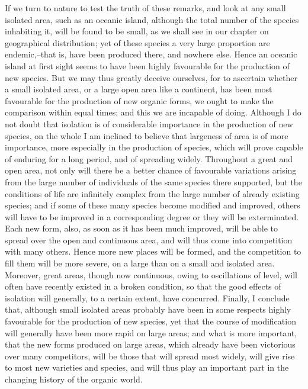 If we turn to nature to test the truth of these remarks, and look at any small isolated area, such as an oceanic island, although the total number of the species inhabiting it, will be found to be small, as we shall see in our chapter on geographical distribution; yet of these species a very large proportion are endemic,--that is, have been produced there, and nowhere else. Hence an oceanic island at first sight seems to have been highly favourable for the production of new species. But we may thus greatly deceive ourselves, for to ascertain whether a small isolated area, or a large open area like a continent, has been most favourable for the production of new organic forms, we ought to make the comparison within equal times; and this we are incapable of doing.
Although I do not doubt that isolation is of considerable importance in the production of new species, on the whole I am inclined to believe that largeness of area is of more importance, more especially in the production of species, which will prove capable of enduring for a long period, and of spreading widely. Throughout a great and open area, not only will there be a better chance of favourable variations arising from the large number of individuals of the same species there supported, but the conditions of life are infinitely complex from the large number of already existing species; and if some of these many species become modified and improved, others will have to be improved in a corresponding degree or they will be exterminated. Each new form, also, as soon as it has been much improved, will be able to spread over the open and continuous area, and will thus come into competition with many others. Hence more new places will be formed, and the competition to fill them will be more severe, on a large than on a small and isolated area. Moreover, great areas, though now continuous, owing to oscillations of level, will often have recently existed in a broken condition, so that the good effects of isolation will generally, to a certain extent, have concurred. Finally, I conclude that, although small isolated areas probably have been in some respects highly favourable for the production of new species, yet that the course of modification will generally have been more rapid on large areas; and what is more important, that the new forms produced on large areas, which already have been victorious over many competitors, will be those that will spread most widely, will give rise to most new varieties and species, and will thus play an important part in the changing history of the organic world.
